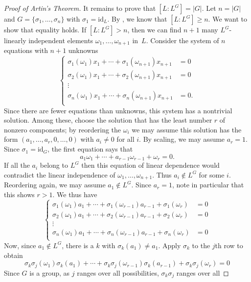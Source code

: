 \documentclass[12pt]{report}
\numberwithin{equation}{section}
\numberwithin{theorem}{chapter}
\theoremstyle{definition}
\newtheorem*{basic properties}{Basic Properties}
\newtheorem*{Important Remark}{Important Remark}
\begin{document}
\begin{proof}[Proof of Artin's Theorem]
It remains to prove that $[L: L^G] = |G|$. Let $n = |G|$ and $G=\{\sigma_1, \ldots, \sigma_n\}$ with $\sigma_1 = \mathrm{id}_L$.
By , we know that $[L: L^G] \geqslant n$. We want to show that equality holds.
If $[L: L^G] > n$, then we can find $n+1$ many $L^G$-linearly independent elements $\omega_1, \ldots, \omega_{n+1}$ in~$L$. Consider the system of $n$ equations with $n+1$ unknowns
$$\left\lbrace\begin{array}{cl}
\sigma_1(\omega_1) x_1 + \cdots + \sigma_1(\omega_{n+1}) x_{n+1} & = 0 \\
\sigma_2(\omega_1) x_1 + \cdots + \sigma_2(\omega_{n+1}) x_{n+1} & = 0 \\
\vdots \\
\sigma_n(\omega_1) x_1 + \cdots + \sigma_n(\omega_{n+1}) x_{n+1} & = 0. \\
\end{array}\right.$$
Since there are fewer equations than unknowns, this system has a nontrivial solution. Among these, choose the solution that has the least number $r$ of nonzero components; by reordering the $\omega_i$ we may assume this solution has the form $(a_1, \ldots, a_r, 0, \ldots, 0)$ with $a_i \neq 0$ for all $i$. By scaling, we may assume $a_r = 1$. Since $\sigma_1 = \mathrm{id}_G$, the first equation says that
$$a_1 \omega_1 + \cdots + a_{r-1} \omega_{r-1} + \omega_r = 0.$$
If all the $a_i$ belong to $L^G$ then this equation of linear dependence would contradict the linear independence of $\omega_1, \ldots, \omega_{n+1}$. Thus $a_i \notin L^G$ for some $i$. Reordering again, we may assume $a_1 \notin L^G$.
Since $a_r =1$, note in particular that this shows $r > 1$.
We thus have
$$\left\lbrace\begin{array}{cl}
\sigma_1(\omega_1) a_1 + \cdots + \sigma_1(\omega_{r-1}) a_{r-1} + \sigma_1(\omega_r)  & = 0 \\
\sigma_2(\omega_1) a_1 + \cdots + \sigma_2(\omega_{r-1}) a_{r-1} + \sigma_2(\omega_r)  & = 0 \\
\vdots \\
\sigma_n(\omega_1) a_1 + \cdots + \sigma_n(\omega_{r-1}) a_{r-1} + \sigma_n(\omega_r)  & = 0 \\
\end{array}\right.$$
Now, since $a_1 \notin L^G$, there is a $k$ with $\sigma_k(a_1) \neq a_1$. Apply $\sigma_k$ to the $j$th row to obtain
$$
\sigma_k \sigma_j(\omega_1) \sigma_k(a_1) + \cdots + \sigma_k \sigma_j(\omega_{r-1})\sigma_k(a_{r-1})
+ \sigma_k \sigma_j(\omega_{r})  = 0
$$
Since $G$ is a group, as $j$ ranges over all possibilities, $\sigma_k \sigma_j$ ranges over all

\end{proof}
\end{document}
